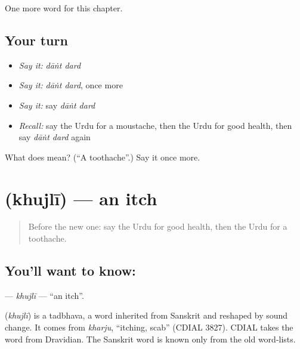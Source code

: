 \begin{grammarlens}[title={What you've built}]
One more word for this chapter.
\end{grammarlens}

\subsection*{Your turn}
\begin{itemize}
\raggedright
  \item \emph{Say it:} \emph{dāṅt dard}
  \item \emph{Say it:} \emph{dāṅt dard}, once more
  \item \emph{Say it:} say \emph{dāṅt dard}
  \item \emph{Recall:} say the Urdu for a moustache, then the Urdu for good health, then say \emph{dāṅt dard} again
\end{itemize}

\begin{tcolorbox}[breakable,colback=teal!4,colframe=teal!35!black,title={Before you move on}]
What does   mean? (\textquotedblleft{}A toothache\textquotedblright{}.) Say it once more.
\end{tcolorbox}
\section[\texorpdfstring{\ur{کھجلی} (khujlī)}{کھجلی (khujlī)}]{ (khujlī) — an itch}

\label{lesson:UR-C217-khujli}



\begin{quote}
Before the new one: say the Urdu for good health, then the Urdu for a toothache.
\end{quote}

\subsection*{You'll want to know: }
\textbf{} — \emph{khujlī} — \textquotedblleft{}an itch\textquotedblright{}.

\begin{cousinweb}
\textbf{} (\emph{khujlī}) is a tadbhava, a word inherited from Sanskrit and reshaped by sound change. It comes from \emph{kharju}, \textquotedblleft{}itching, scab\textquotedblright{} (CDIAL 3827). CDIAL takes the word from Dravidian. The Sanskrit word is known only from the old word-lists.
\end{cousinweb}

